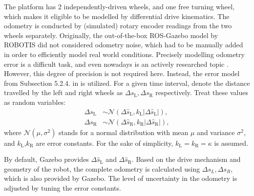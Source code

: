 The platform has 2 independently-driven wheels, and one free turning wheel, which
makes it eligible to be modelled by differential drive kinematics.
The odometry is conducted by (simulated) rotary encoder readings from the two wheels separately.
Originally, the out-of-the-box ROS-Gazebo model by ROBOTIS did not considered odometry noise,
which had to be manually added in order to efficiently model real world conditions.
Precisely modelling odometry error is a difficult task, and even nowadays is an actively researched topic \cite{Fazekas2021}.
However, this degree of precision is not required here.
Instead, the error model from Subsection 5.2.4. in \cite{Siegwart2011} is utilized.
For a given time interval, denote the distance travelled by the
left and right wheels as $\Delta s_{\text{L}}, \Delta s_{\text{R}}$
respectively. Treat these values as random variables:
\begin{align}
    \Delta s_{\text{L}} & \sim \mathcal{N}(\Delta \hat{s}_{\text{L}},k_{\text{L}}|\Delta \hat{s}_{\text{L}}|), \label{eq:odom-noise1} \\
    \Delta s_{\text{R}} & \sim \mathcal{N}(\Delta \hat{s}_{\text{R}},k_{\text{R}}|\Delta \hat{s}_{\text{R}}|),\label{eq:odom-noise2}
\end{align}
where $\mathcal{N}(\mu,\sigma^{2})$ stands for a normal distribution with mean $\mu$ and variance $\sigma^{2}$, and $k_{\text{L}}$,$k_{\text{R}}$ are error constants.
For the sake of simplicity, $k_{\text{L}} = k_{\text{R}} = \kappa$ is assumed.

By default, Gazebo provides $\Delta \hat{s}_{\text{L}}$ and $\Delta \hat{s}_{\text{R}}$. Based on the drive mechanism and geometry of the robot, the complete odometry is calculated using $\Delta s_{L},\Delta s_{R}$, which is also provided by Gazebo. The level of uncertainty in the odometry is adjusted
by tuning the error constants.



